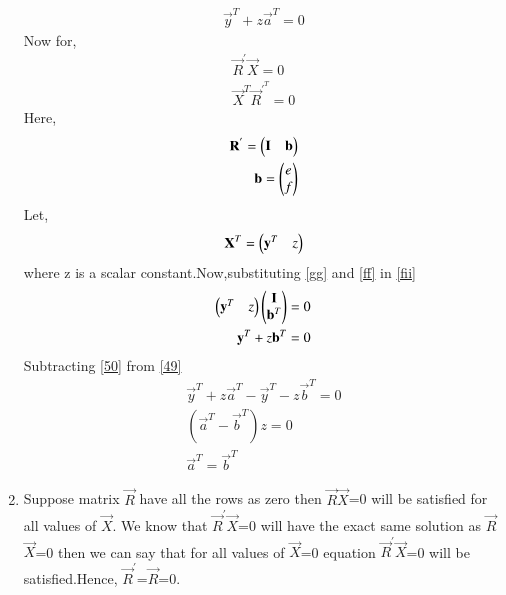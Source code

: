 \documentclass[journal,12pt,twocolumn]{IEEEtran}
\begin{document}
\begin{enumerate}
\begin{align}
  \vec{y}^T+z\vec{a}^T=0\label{49}
  \end{align}
  Now for,
  \begin{align}
  \vec{R}^{'}\vec{X}=0\label{ee}\\
  \vec{X}^{T}\vec{R}^{'}^{T}=0\label{fii}
  \end{align}
  Here,
  \begin{align}
  \mathbf{R}^{'}=\begin{pmatrix}\mathbf{I}&\mathbf{b}\end{pmatrix}\label{ff}\\
  \mathbf{b}=\begin{pmatrix}e\\f\end{pmatrix}
  \end{align}
  Let,
  \begin{align}
  \mathbf{X}^T=\begin{pmatrix}\mathbf{y}^T&z\end{pmatrix}\label{gg}
  \end{align}
  where z is a scalar constant.Now,substituting \eqref{gg} and \eqref{ff} in \eqref{fii}
  \begin{align}
    \begin{pmatrix}\mathbf{y}^T&z\end{pmatrix}\begin{pmatrix}\mathbf{I}\\\mathbf{b}^T\end{pmatrix}=0\\
  \mathbf{y}^T+z\mathbf{b}^T=0\label{50}
  \end{align}
  Subtracting \eqref{50} from \eqref{49} 
  \begin{align}
    \vec{y}^T+z\vec{a}^T-\vec{y}^T-z\vec{b}^T=0\\
    (\vec{a}^T-\vec{b}^T)z=0\label{part2}\\
    \vec{a}^T=\vec{b}^T
  \end{align}
  \item Suppose matrix $\vec{R}$ have all the rows as zero then $\vec{R}$$\vec{X}$=0 will be satisfied for all values of $\vec{X}$. We know that $\vec{R}^'$$\vec{X}$=0 will have the exact same solution as 
 $\vec{R}$$\vec{X}$=0 then we can say that for all values of $\vec{X}$=0 equation $\vec{R}^{'}$$\vec{X}$=0 will be satisfied.Hence, $\vec{R}^{'}$=$\vec{R}$=0.

\end{enumerate}
\end{document}
